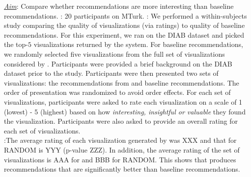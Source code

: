 {\it \underline{Aim}}: Compare whether \SeeDB recommendations are more interesting than baseline recommendations.
: 20 participants on MTurk.
: We performed a within-subjects study comparing the quality of \SeeDB visualizations (via ratings) to quality of baseline recommendations.
For this experiment, we ran \SeeDB on the DIAB dataset and picked the top-$5$ visualizations returned by the system.
For baseline recommendations, we randomly selected five visualizations from
the full set of visualizations considered by \SeeDB.
Participants were provided a brief background on the DIAB dataset prior to the study.
Participants were then presented two sets of visualizations: the recommendations from \SeeDB and baseline recommendations. 
The order of presentation was randomized to avoid order effects.
For each set of visualizations, participants were asked to rate each visualization on a scale of 1 (lowest) - 5 (highest) based on how {\it interesting, insightful or valuable} they found the visualization.
Participants were also asked to provide an overall rating for each set of visualizations.\\
:The average rating of each visualization generated by \SeeDB was XXX and that for RANDOM is YYY (p-value ZZZ).
In addition, the average rating of the set of visualizations is AAA for \SeeDB and BBB for RANDOM.
This shows that \SeeDB produces recommendations that are significantly better than baseline recommendations.



